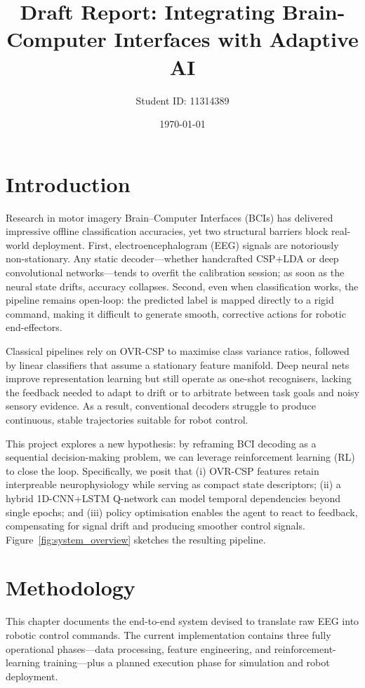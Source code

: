 \documentclass[twocolumn]{article}
\title{\textbf{Draft Report: Integrating Brain-Computer Interfaces with Adaptive AI}}
\author{Student ID: 11314389}
\date{\today}
\begin{document}
\maketitle

\section{Introduction}

Research in motor imagery Brain--Computer Interfaces (BCIs) has delivered impressive offline classification accuracies, yet two structural barriers block real-world deployment. First, electroencephalogram (EEG) signals are notoriously non-stationary. Any static decoder---whether handcrafted CSP+LDA or deep convolutional networks---tends to overfit the calibration session; as soon as the neural state drifts, accuracy collapses. Second, even when classification works, the pipeline remains open-loop: the predicted label is mapped directly to a rigid command, making it difficult to generate smooth, corrective actions for robotic end-effectors.

Classical pipelines rely on OVR-CSP to maximise class variance ratios, followed by linear classifiers that assume a stationary feature manifold. Deep neural nets improve representation learning but still operate as one-shot recognisers, lacking the feedback needed to adapt to drift or to arbitrate between task goals and noisy sensory evidence. As a result, conventional decoders struggle to produce continuous, stable trajectories suitable for robot control.

This project explores a new hypothesis: by reframing BCI decoding as a sequential decision-making problem, we can leverage reinforcement learning (RL) to close the loop. Specifically, we posit that (i) OVR-CSP features retain interpreable neurophysiology while serving as compact state descriptors; (ii) a hybrid 1D-CNN+LSTM Q-network can model temporal dependencies beyond single epochs; and (iii) policy optimisation enables the agent to react to feedback, compensating for signal drift and producing smoother control signals. Figure~\ref{fig:system_overview} sketches the resulting pipeline.

\section{Methodology}

This chapter documents the end-to-end system devised to translate raw EEG into robotic control commands. The current implementation contains three fully operational phases---data processing, feature engineering, and reinforcement-learning training---plus a planned execution phase for simulation and robot deployment.
\end{document}
